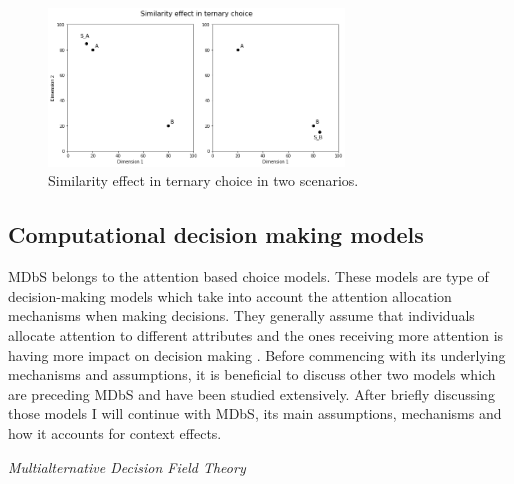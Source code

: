 \documentclass[a4paper,12pt]{article}
\begin{document}
\begin{figure}[h]
    \centering
    \includegraphics[width=0.7\textwidth]{staticFiles/SimilarityEffect.png}
    \caption{Similarity effect in ternary choice in two scenarios.} %
    \label{fig:similarityEffect} %

\end{figure}


\subsection{Computational decision making models}

MDbS belongs to the attention based choice models. These models are type of decision-making models which take into account the attention allocation mechanisms when making decisions. They generally assume that individuals allocate attention to different attributes and the ones receiving more attention is having more impact on decision making \citep{gabaix2000boundedly}. Before commencing with its underlying mechanisms and assumptions, it is beneficial to discuss other two models which are preceding MDbS and have been studied extensively. After briefly discussing those models I will continue with MDbS, its main assumptions, mechanisms and how it accounts for context effects.

\textit{Multialternative Decision Field Theory}
\end{document}
